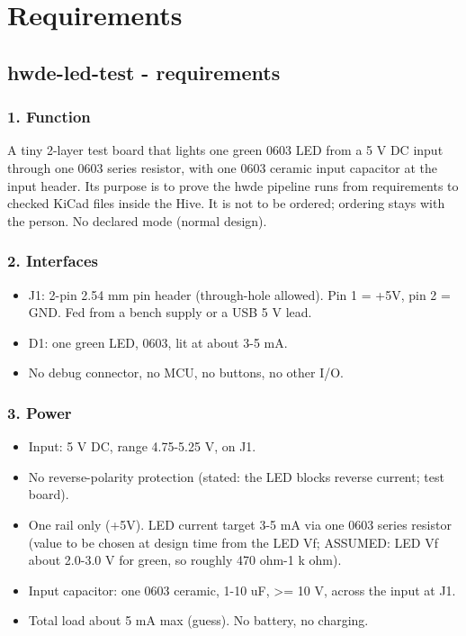 \documentclass[11pt]{article}
\begin{document}
\section{Requirements}
\subsection*{hwde-led-test - requirements}
\subsubsection*{1. Function}
A tiny 2-layer test board that lights one green 0603 LED from a 5 V DC input through one 0603 series resistor, with one 0603 ceramic input capacitor at the input header. Its purpose is to prove the hwde pipeline runs from requirements to checked KiCad files inside the Hive. It is not to be ordered; ordering stays with the person. No declared mode (normal design).

\subsubsection*{2. Interfaces}
\begin{itemize}
\item J1: 2-pin 2.54 mm pin header (through-hole allowed). Pin 1 = +5V, pin 2 = GND.
Fed from a bench supply or a USB 5 V lead.
\item D1: one green LED, 0603, lit at about 3-5 mA.
\item No debug connector, no MCU, no buttons, no other I/O.
\end{itemize}
\subsubsection*{3. Power}
\begin{itemize}
\item Input: 5 V DC, range 4.75-5.25 V, on J1.
\item No reverse-polarity protection (stated: the LED blocks reverse current; test board).
\item One rail only (+5V). LED current target 3-5 mA via one 0603 series resistor
(value to be chosen at design time from the LED Vf; ASSUMED: LED Vf about 2.0-3.0 V
for green, so roughly 470 ohm-1 k ohm).
\item Input capacitor: one 0603 ceramic, 1-10 uF, \textgreater{}= 10 V, across the input at J1.
\item Total load about 5 mA max (guess). No battery, no charging.
\end{itemize}
\end{document}
